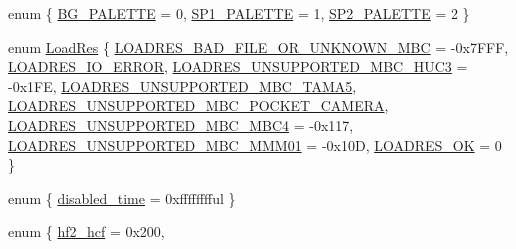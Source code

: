 \begin{DoxyCompactItemize}
\item 
enum \{ \hyperlink{namespacegambatte_ad9c70f3378d05922c2f840895c8bf947a4ff5d164c430e0ce9e58bd780476b9bf}{B\+G\+\_\+\+P\+A\+L\+E\+T\+TE} = 0, 
\hyperlink{namespacegambatte_ad9c70f3378d05922c2f840895c8bf947a161fa2628f972e86dd15ec368873ea6a}{S\+P1\+\_\+\+P\+A\+L\+E\+T\+TE} = 1, 
\hyperlink{namespacegambatte_ad9c70f3378d05922c2f840895c8bf947a98d2c08127d4414b963974d17b92a009}{S\+P2\+\_\+\+P\+A\+L\+E\+T\+TE} = 2
 \}
\item 
enum \hyperlink{namespacegambatte_a42606f494711d2e2870a5f5cdf69e468}{Load\+Res} \{ \newline
\hyperlink{namespacegambatte_a42606f494711d2e2870a5f5cdf69e468a684ef4e533fecf944d399daf1b75818d}{L\+O\+A\+D\+R\+E\+S\+\_\+\+B\+A\+D\+\_\+\+F\+I\+L\+E\+\_\+\+O\+R\+\_\+\+U\+N\+K\+N\+O\+W\+N\+\_\+\+M\+BC} = -\/0x7\+F\+FF, 
\hyperlink{namespacegambatte_a42606f494711d2e2870a5f5cdf69e468ac75330653670aa86df7eedbc8c2de454}{L\+O\+A\+D\+R\+E\+S\+\_\+\+I\+O\+\_\+\+E\+R\+R\+OR}, 
\hyperlink{namespacegambatte_a42606f494711d2e2870a5f5cdf69e468ad1d3fc2898a6bf03f06c65b98c606b38}{L\+O\+A\+D\+R\+E\+S\+\_\+\+U\+N\+S\+U\+P\+P\+O\+R\+T\+E\+D\+\_\+\+M\+B\+C\+\_\+\+H\+U\+C3} = -\/0x1\+FE, 
\hyperlink{namespacegambatte_a42606f494711d2e2870a5f5cdf69e468a7af71927702a3419ceff85f6d626b9d3}{L\+O\+A\+D\+R\+E\+S\+\_\+\+U\+N\+S\+U\+P\+P\+O\+R\+T\+E\+D\+\_\+\+M\+B\+C\+\_\+\+T\+A\+M\+A5}, 
\newline
\hyperlink{namespacegambatte_a42606f494711d2e2870a5f5cdf69e468a3e7657bdf23c54bc5fe8d92ddb40c130}{L\+O\+A\+D\+R\+E\+S\+\_\+\+U\+N\+S\+U\+P\+P\+O\+R\+T\+E\+D\+\_\+\+M\+B\+C\+\_\+\+P\+O\+C\+K\+E\+T\+\_\+\+C\+A\+M\+E\+RA}, 
\hyperlink{namespacegambatte_a42606f494711d2e2870a5f5cdf69e468a7e3c06b63f325898a1754f3310677feb}{L\+O\+A\+D\+R\+E\+S\+\_\+\+U\+N\+S\+U\+P\+P\+O\+R\+T\+E\+D\+\_\+\+M\+B\+C\+\_\+\+M\+B\+C4} = -\/0x117, 
\hyperlink{namespacegambatte_a42606f494711d2e2870a5f5cdf69e468a96d88487d6bc39db3a891030d8a6787c}{L\+O\+A\+D\+R\+E\+S\+\_\+\+U\+N\+S\+U\+P\+P\+O\+R\+T\+E\+D\+\_\+\+M\+B\+C\+\_\+\+M\+M\+M01} = -\/0x10D, 
\hyperlink{namespacegambatte_a42606f494711d2e2870a5f5cdf69e468a276a570eee7b06c819f588c3daa95cb8}{L\+O\+A\+D\+R\+E\+S\+\_\+\+OK} = 0
 \}
\item 
enum \{ \hyperlink{namespacegambatte_aa7f723fd2b50e8c1854b779565e654eaaa469bca0431ea0eafcad2f32ec5324ea}{disabled\+\_\+time} = 0xfffffffful
 \}
\item 
enum \{ \hyperlink{namespacegambatte_aff981a988feab5d1ffdb3602328e28cfaf64f53445c4545c35875e955a3fbad58}{hf2\+\_\+hcf} = 0x200, 

\end{DoxyCompactItemize}

